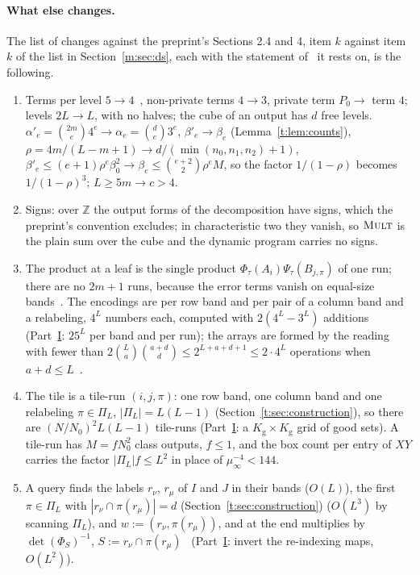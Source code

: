 \documentclass[11pt]{article}
\theoremstyle{definition}
\theoremstyle{remark}
\newcommand{\Z}{\mathbb{Z}}
\newcommand{\Mult}{\textnormal{\textsc{Mult}}}
\newcommand{\Nz}{N_0}
\newcommand{\Kg}{K_{\mathrm g}}
\begin{document}
\paragraph{What else changes.} The list of changes against the preprint's Sections 2.4 and 4, item $k$ against item $k$ of the list in Section~\ref{m:sec:ds}, each with the statement of~\cite{Maj26b} it rests on, is the following.
\begin{enumerate}[label=(\arabic*),nosep]
\item Terms per level $5\to4$~\cite[Lemma~2.1]{Maj26b}, non-private terms $4\to3$, private term $P_0\to$ term $4$; levels $2L\to L$, with no halves; the cube of an output has $d$ free levels. $\alpha'_e=\binom{2m}e4^e\to\alpha_e=\binom de3^e$, $\beta'_e\to\beta_e$ (Lemma~\ref{t:lem:counts}), $\rho=4m/(L-m+1)\to d/(\min(n_0,n_1,n_2)+1)$, $\beta'_e\le(e+1)\rho^e\beta_0^2\to\beta_e\le\binom{e+2}2\rho^eM$, so the factor $1/(1-\rho)$ becomes $1/(1-\rho)^3$; $L\ge5m\to c>4$.
\item Signs: over $\Z$ the output forms of the decomposition have signs, which the preprint's convention excludes; in characteristic two they vanish, so $\Mult$ is the plain sum over the cube and the dynamic program carries no signs.
\item The product at a leaf is the single product $\Phi_\tau(A_i)\Psi_\tau(B_{j,\pi})$ of one run; there are no $2m+1$ runs, because the error terms vanish on equal-size bands~\cite[Lemma~3.1]{Maj26b}. The encodings are per row band and per pair of a column band and a relabeling, $4^L$ numbers each, computed with $2(4^L-3^L)$ additions~\cite[Lemma~2.3]{Maj26b} (Part~\hyperref[m:partI]{I}: $25^L$ per band and per run); the arrays are formed by the reading with fewer than $2\binom La\binom{a+d}d\le2^{L+a+d+1}\le2\cdot4^L$ operations when $a+d\le L$~\cite[Table~2, step~1, and the paragraph after it]{Maj26b}.
\item The tile is a tile-run $(i,j,\pi)$: one row band, one column band and one relabeling $\pi\in\Pi_L$, $|\Pi_L|=L(L-1)$ (Section~\ref{t:sec:construction}), so there are $(N/\Nz)^2L(L-1)$ tile-runs (Part~\hyperref[m:partI]{I}: a $\Kg\times\Kg$ grid of good sets). A tile-run has $M=f\Nz^2$ class outputs, $f\le1$, and the box count per entry of $XY$ carries the factor $|\Pi_L|f\le L^2$ in place of $\mu_\infty^{-4}<144$.
\item A query finds the labels $r_\nu$, $r_\mu$ of $I$ and $J$ in their bands ($O(L)$), the first $\pi\in\Pi_L$ with $|r_\nu\cap\pi(r_\mu)|=d$ (Section~\ref{t:sec:construction}) ($O(L^3)$ by scanning $\Pi_L$), and $w:=(r_\nu,\pi(r_\mu))$, and at the end multiplies by $\det(\Phi_S)^{-1}$, $S:=r_\nu\cap\pi(r_\mu)$~\cite[Proposition~3.2]{Maj26b} (Part~\hyperref[m:partI]{I}: invert the re-indexing maps, $O(L^2)$).

\end{enumerate}
\end{document}
